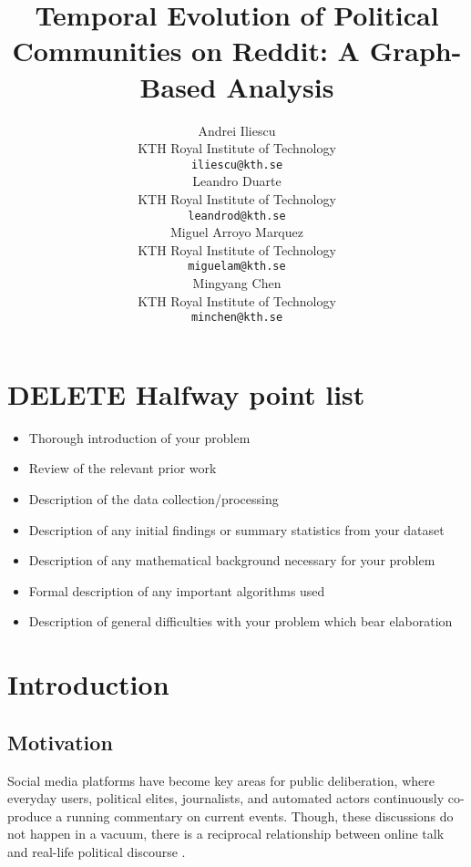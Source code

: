 \documentclass{article}
\title{Temporal Evolution of Political Communities on Reddit: A Graph-Based Analysis}
\author{
  Andrei Iliescu \\
  KTH Royal Institute of Technology\\
  \texttt{iliescu@kth.se} \\
  \And
  Leandro Duarte \\
  KTH Royal Institute of Technology\\
  \texttt{leandrod@kth.se} \\
  \And
  Miguel Arroyo Marquez \\
  KTH Royal Institute of Technology\\
  \texttt{miguelam@kth.se} \\
  \And
  Mingyang Chen \\
  KTH Royal Institute of Technology\\
  \texttt{minchen@kth.se} \\
}
\begin{document}
\maketitle

\begin{abstract}
\end{abstract}

\section{\textbf{DELETE} Halfway point list}
\begin{itemize}
    \item Thorough introduction of your problem
    \item Review of the relevant prior work
    \item Description of the data collection/processing
    \item Description of any initial findings or summary statistics from your dataset
    \item Description of any mathematical background necessary for your problem
    \item Formal description of any important algorithms used
    \item Description of general difficulties with your problem which bear elaboration
\end{itemize}



\section{Introduction}

\subsection{Motivation}

Social media platforms have become key areas for public deliberation, where everyday users, political elites, journalists, and automated actors continuously co-produce a running commentary on current events. Though, these discussions do not happen in a vacuum, there is a reciprocal relationship between online talk and real-life political discourse \cite{effectnewsitaly}. 
\end{document}
